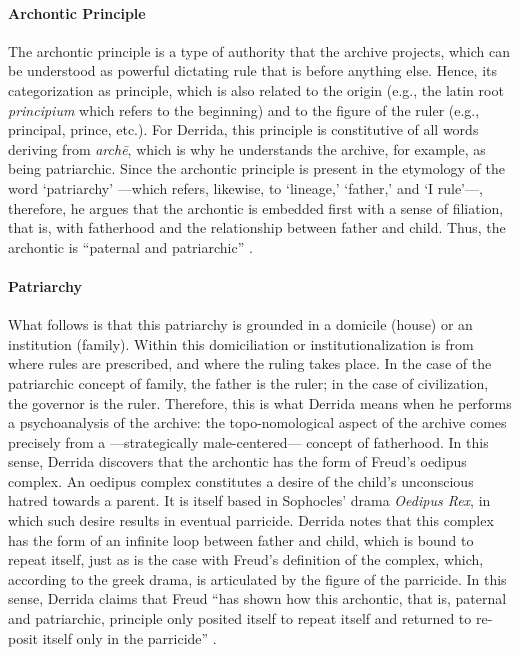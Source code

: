 \paragraph{Archontic Principle}
The archontic principle is a type of authority that the archive projects, which can be understood as powerful dictating rule that is before anything else. Hence, its categorization as principle, which is also related to the origin (e.g., the latin root \textit{principium} which refers to the beginning) and to the figure of the ruler (e.g., principal, prince, etc.). For Derrida, this principle is constitutive of all words deriving from \textit{archē}, which is why he understands the archive, for example, as being patriarchic. Since the archontic principle is present in the etymology of the word `patriarchy' ---which refers, likewise, to `lineage,' `father,' and `I rule'---, therefore, he argues that the archontic is embedded first with a sense of filiation, that is, with fatherhood and the relationship between father and child. Thus, the archontic is ``paternal and patriarchic'' \parencite[60]{Der95:Arc}. 

\paragraph{Patriarchy}
What follows is that this patriarchy is grounded in a domicile (house) or an institution (family). Within this domiciliation or institutionalization is from where rules are prescribed, and where the ruling takes place. In the case of the patriarchic concept of family, the father is the ruler; in the case of civilization, the governor is the ruler. Therefore, this is what Derrida means when he performs a psychoanalysis of the archive: the topo-nomological aspect of the archive comes precisely from a ---strategically male-centered--- concept of fatherhood. In this sense, Derrida discovers that the archontic has the form of Freud's oedipus complex. An oedipus complex constitutes a desire of the child's unconscious hatred towards a parent. It is itself based in Sophocles' drama \textit{Oedipus Rex}, in which such desire results in eventual parricide. Derrida notes that this complex has the form of an infinite loop between father and child, which is bound to repeat itself, just as is the case with Freud's definition of the complex, which, according to the greek drama, is articulated by the figure of the parricide. In this sense, Derrida claims that Freud ``has shown how this archontic, that is, paternal and patriarchic, principle only posited itself to repeat itself and returned to re-posit itself only in the parricide'' \parencite[60]{Der95:Arc}.
